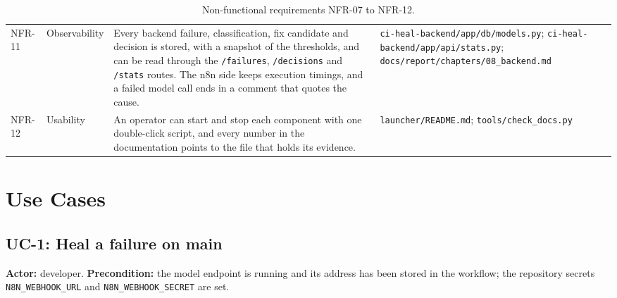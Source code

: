 \begin{table}[!htbp]
\begin{tabularx}{\linewidth}{>{\raggedright\arraybackslash}p{1.4cm}>{\raggedright\arraybackslash}p{2.3cm}>{\raggedright\arraybackslash}X>{\raggedright\arraybackslash}X}
NFR-11 & Observability & Every backend failure, classification, fix candidate and decision is stored, with a snapshot of the thresholds, and can be read through the \texttt{/failures}, \texttt{/decisions} and \texttt{/stats} routes. The n8n side keeps execution timings, and a failed model call ends in a comment that quotes the cause. & \texttt{ci-heal-backend/\allowbreak{}app/\allowbreak{}db/\allowbreak{}models.py}; \texttt{ci-heal-backend/\allowbreak{}app/\allowbreak{}api/\allowbreak{}stats.py}; \texttt{docs/\allowbreak{}report/\allowbreak{}chapters/\allowbreak{}08\_\allowbreak{}backend.md} \\
NFR-12 & Usability & An operator can start and stop each component with one double-click script, and every number in the documentation points to the file that holds its evidence. & \texttt{launcher/\allowbreak{}README.md}; \texttt{tools/\allowbreak{}check\_\allowbreak{}docs.py} \\
\bottomrule
\end{tabularx}
\caption{Non-functional requirements NFR-07 to NFR-12.}
\label{tab:nfr2}
\end{table}

\section{Use Cases}

\subsection{UC-1: Heal a failure on main}

\textbf{Actor:} developer. \textbf{Precondition:} the model endpoint is running and its address has been stored in the workflow; the repository secrets \texttt{N8N\_WEBHOOK\_URL} and \texttt{N8N\_WEBHOOK\_SECRET} are set.

